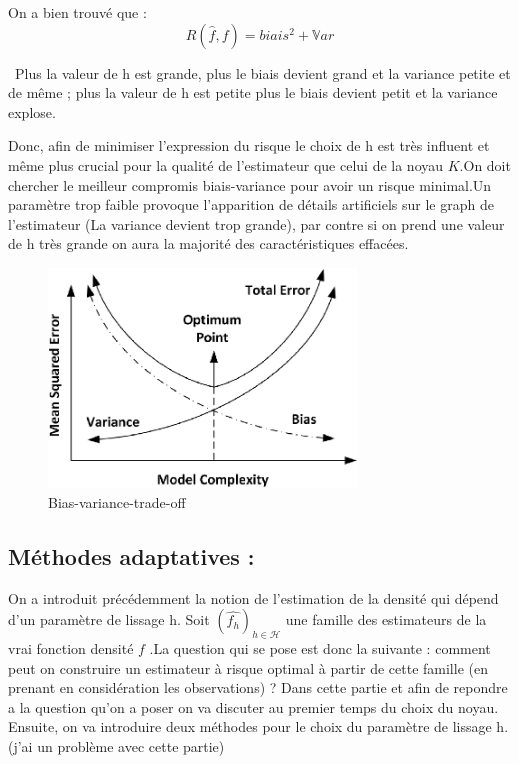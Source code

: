 \documentclass[
]{article}
\begin{document}
On a bien trouvé que : \[R(\hat{f},f)=biais^2+\mathbb Var\]

\begin{remark}\
   Plus la  valeur de h est grande, plus le biais devient grand et la variance petite et de même ;  
   plus la valeur de h est petite plus le biais devient petit et la variance explose.\newline
\end{remark}

Donc, afin de minimiser l'expression du risque le choix de h est très
influent et même plus crucial pour la qualité de l'estimateur que celui
de la noyau \(K\).\newline On doit chercher le meilleur compromis
biais-variance pour avoir un risque minimal.\newline Un paramètre trop
faible provoque l'apparition de détails artificiels sur le graph de
l'estimateur (La variance devient trop grande), par contre si on prend
une valeur de h très grande on aura la majorité des caractéristiques
effacées.\newline

\hspace*{4cm}

\begin{figure}
\centering
\includegraphics[width=3.22917in,height=\textheight]{Images/Bias_variance_trade_off.png}
\caption{Bias-variance-trade-off}
\end{figure}

\subsection{Méthodes adaptatives :}

\hspace*{0.5cm} On a introduit précédemment la notion de l'estimation de
la densité qui dépend d'un paramètre de lissage h. Soit
\((\hat{f_h})_{h\in \mathcal H}\) une famille des estimateurs de la vrai
fonction densité \(f\) .\newline La question qui se pose est donc la
suivante : comment peut on construire un estimateur à risque optimal à
partir de cette famille (en prenant en considération les observations) ?
\newline \hspace*{0.5cm} Dans cette partie et afin de repondre a la
question qu'on a poser on va discuter au premier temps du choix du
noyau. Ensuite, on va introduire deux méthodes pour le choix du
paramètre de lissage h. (j'ai un problème avec cette partie)
\end{document}
